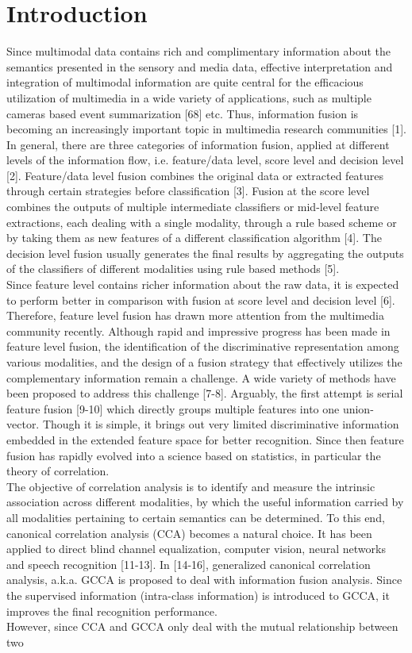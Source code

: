 \documentclass[journal]{IEEEtran}
\begin{document}
\section{Introduction}
Since multimodal data contains rich and complimentary information about the semantics presented in the sensory and media data, effective interpretation and integration of multimodal information are quite central for the efficacious utilization of multimedia in a wide variety of applications, such as multiple cameras based event summarization [68] etc. Thus, information fusion is becoming an increasingly important topic in multimedia research communities [1]. In general, there are three categories of information fusion, applied at different levels of the information flow, i.e.  feature/data level, score level and decision level [2]. Feature/data level fusion combines the original data or extracted features through certain strategies before classification [3]. Fusion at the score level combines the outputs of multiple intermediate classifiers or mid-level feature extractions, each dealing with a single modality, through a rule based scheme or by taking them as new features of a different classification algorithm [4]. The decision level fusion usually generates the final results by aggregating the outputs of the classifiers of different modalities using rule based methods [5].\\\indent Since feature level contains richer information about the raw data, it is expected to perform better in comparison with fusion at score level and decision level [6]. Therefore, feature level fusion has drawn more attention from the multimedia community recently. Although rapid and impressive progress has been made in feature level fusion, the identification of the discriminative representation among various modalities, and the design of a fusion strategy that effectively utilizes the complementary information remain a challenge. A wide variety of methods have been proposed to address this challenge [7-8]. Arguably, the first attempt is serial feature fusion [9-10] which directly groups multiple features into one union-vector. Though it is simple, it brings out very limited discriminative information embedded in the extended feature space for better recognition. Since then feature fusion has rapidly evolved into a science based on statistics, in particular the theory of correlation.\\\indent The objective of correlation analysis is to identify and measure the intrinsic association across different modalities, by which the useful information carried by all modalities pertaining to certain semantics can be determined. To this end, canonical correlation analysis (CCA) becomes a natural choice. It has been applied to direct blind channel equalization, computer vision, neural networks and speech recognition [11-13]. In [14-16], generalized canonical correlation analysis, a.k.a. GCCA is proposed to deal with information fusion analysis. Since the supervised information (intra-class information) is introduced to GCCA, it improves the final recognition performance.\\\indent However, since CCA and GCCA only deal with the mutual relationship between two 
\end{document}

